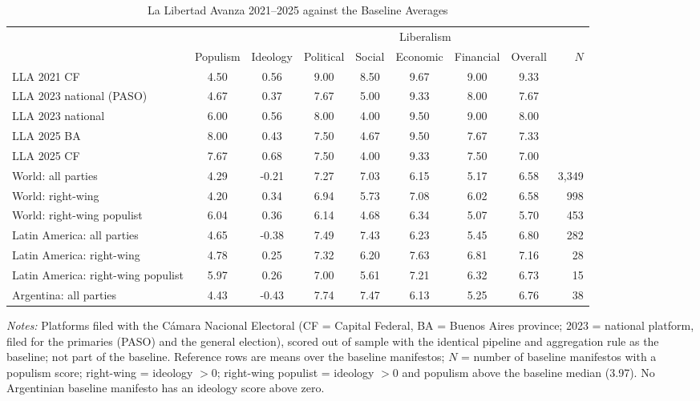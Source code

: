 \begin{table}[htbp]\centering\scriptsize\setlength{\tabcolsep}{4pt}
\caption{La Libertad Avanza 2021--2025 against the Baseline Averages}\label{tab:argentina_lla}
\begin{tabular}{@{}lcccccccr@{}}\toprule
 & & & \multicolumn{5}{c}{Liberalism} & \\ \cmidrule(lr){4-8}
 & Populism & Ideology & Political & Social & Economic & Financial & Overall & $N$ \\ \midrule
LLA 2021 CF & 4.50 & 0.56 & 9.00 & 8.50 & 9.67 & 9.00 & 9.33 & \\
LLA 2023 national (PASO) & 4.67 & 0.37 & 7.67 & 5.00 & 9.33 & 8.00 & 7.67 & \\
LLA 2023 national & 6.00 & 0.56 & 8.00 & 4.00 & 9.50 & 9.00 & 8.00 & \\
LLA 2025 BA & 8.00 & 0.43 & 7.50 & 4.67 & 9.50 & 7.67 & 7.33 & \\
LLA 2025 CF & 7.67 & 0.68 & 7.50 & 4.00 & 9.33 & 7.50 & 7.00 & \\
\midrule
World: all parties & 4.29 & -0.21 & 7.27 & 7.03 & 6.15 & 5.17 & 6.58 & 3,349 \\
World: right-wing & 4.20 & 0.34 & 6.94 & 5.73 & 7.08 & 6.02 & 6.58 & 998 \\
World: right-wing populist & 6.04 & 0.36 & 6.14 & 4.68 & 6.34 & 5.07 & 5.70 & 453 \\
Latin America: all parties & 4.65 & -0.38 & 7.49 & 7.43 & 6.23 & 5.45 & 6.80 & 282 \\
Latin America: right-wing & 4.78 & 0.25 & 7.32 & 6.20 & 7.63 & 6.81 & 7.16 & 28 \\
Latin America: right-wing populist & 5.97 & 0.26 & 7.00 & 5.61 & 7.21 & 6.32 & 6.73 & 15 \\
Argentina: all parties & 4.43 & -0.43 & 7.74 & 7.47 & 6.13 & 5.25 & 6.76 & 38 \\
\bottomrule\end{tabular}
\begin{minipage}{0.95\textwidth}\vspace{2pt}\scriptsize\textit{Notes:} Platforms filed with the C\'amara Nacional Electoral (CF = Capital Federal, BA = Buenos Aires province; 2023 = national platform, filed for the primaries (PASO) and the general election), scored out of sample with the identical pipeline and aggregation rule as the baseline; not part of the baseline. Reference rows are means over the baseline manifestos; $N$ = number of baseline manifestos with a populism score; right-wing = ideology $> 0$; right-wing populist = ideology $> 0$ and populism above the baseline median (3.97). No Argentinian baseline manifesto has an ideology score above zero.\end{minipage}
\end{table}
